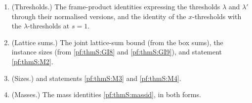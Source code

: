 \begin{theorem}
\begin{enumerate}[label=(GI\arabic*)]
$\nu_{r,i,s}=2(r+1)-i-(i-1+s)$; the norm formula $\sqrt{N(\mathfrak a(g,k,\nu))}=(g^k\mathrm{rd}^\nu)^{\deg}$; and the degree facts
$[E:\Q]=2\deg$, $E$ has $\deg>0$ infinite places.
\item\label{pf:thmS:GI9} (Thresholds.) The frame-product identities expressing the thresholds $\lambda$ and $\lambda'$ through their
normalised versions, and the identity of the $x$-thresholds with the $\lambda$-thresholds at $s=1$.
\item\label{pf:thmS:GI10} (Lattice sums.) The joint lattice-sum bound (from the box sums), the instance sizes (from
\ref{pf:thmS:GI8} and \ref{pf:thmS:GI9}), and statement \ref{pf:thmS:M2}.
\item\label{pf:thmS:GI11} (Sizes.)  and statements \ref{pf:thmS:M3} and \ref{pf:thmS:M4}.
\item\label{pf:thmS:GI12} (Masses.) The mass identities \cref{pf:thmS:massid}, in both forms.
\end{enumerate}
\end{theorem}

